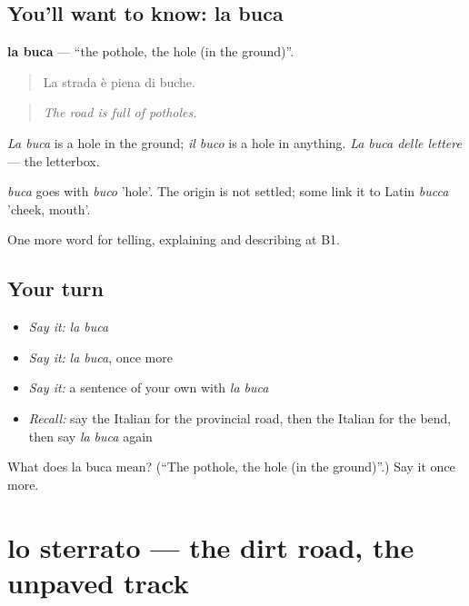 \subsection*{You'll want to know: la buca}
\textbf{la buca} — \textquotedblleft{}the pothole, the hole (in the ground)\textquotedblright{}.

\begin{quote}
La strada è piena di buche.
\end{quote}

\begin{quote}
\emph{The road is full of potholes.}
\end{quote}

\emph{La buca} is a hole in the ground; \emph{il buco} is a hole in anything. \emph{La buca delle lettere} — the letterbox.

\begin{cousinweb}
\emph{buca} goes with \emph{buco} 'hole'. The origin is not settled; some link it to Latin \emph{bucca} 'cheek, mouth'.
\end{cousinweb}

\begin{grammarlens}[title={What you've built}]
One more word for telling, explaining and describing at B1.
\end{grammarlens}

\subsection*{Your turn}
\begin{itemize}
\raggedright
  \item \emph{Say it:} \emph{la buca}
  \item \emph{Say it:} \emph{la buca}, once more
  \item \emph{Say it:} a sentence of your own with \emph{la buca}
  \item \emph{Recall:} say the Italian for the provincial road, then the Italian for the bend, then say \emph{la buca} again
\end{itemize}

\begin{tcolorbox}[breakable,colback=teal!4,colframe=teal!35!black,title={Before you move on}]
What does la buca mean? (\textquotedblleft{}The pothole, the hole (in the ground)\textquotedblright{}.) Say it once more.
\end{tcolorbox}
\section[lo sterrato]{lo sterrato — the dirt road, the unpaved track}

